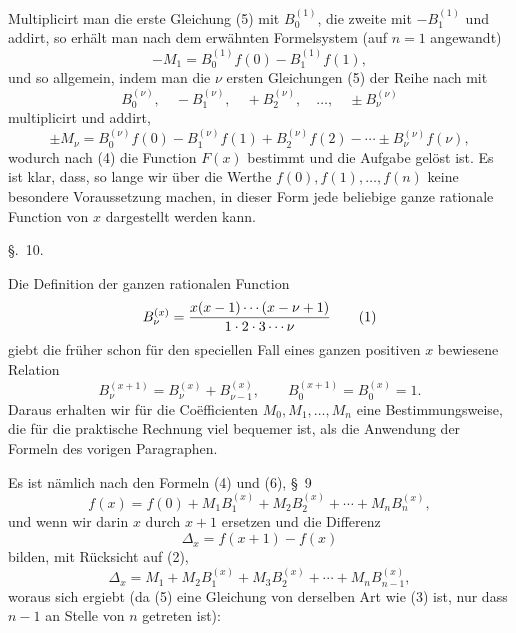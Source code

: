 
Multiplicirt man die erste Gleichung (5) mit $B_0^{(1)}$, die zweite mit $-B_1^{(1)}$ und addirt, so erhält man nach dem erwähnten Formelsystem (auf $n=1$ angewandt)
\[
 -M_1=B_0^{(1)}f(0)-B_1^{(1)}f(1),
\]
und so allgemein, indem man die $\nu$ ersten Gleichungen (5) der Reihe nach mit
\[
 B_0^{(\nu)},\quad -B_1^{(\nu)},\quad +B_2^{(\nu)},\quad \ldots,\quad \pm B_\nu^{(\nu)}
\]
multiplicirt und addirt,
\begin{equation}
 \pm M_\nu=B_0^{(\nu)}f(0)-B_1^{(\nu)}f(1)+B_2^{(\nu)}f(2)-\cdots\pm B_\nu^{(\nu)}f(\nu),
\tag{7}
\end{equation}
wodurch nach (4) die Function $F(x)$ bestimmt und die Aufgabe gelöst ist. Es ist klar, dass, so lange wir über die Werthe $f(0),f(1),\ldots,f(n)$ keine besondere Voraussetzung machen, in dieser Form jede beliebige ganze rationale Function von $x$ dargestellt werden kann.

\begin{center}
{\large \S.\ 10.}

\vspace{0.5em}
{\large{}}
\end{center}

Die Definition der ganzen rationalen Function
\begin{equation}
 B_\nu^{(x)}={x(x-1)\cdots(x-\nu+1)\over 1\cdot2\cdot3\cdots\nu}
\tag{1}
\end{equation}
giebt die früher schon für den speciellen Fall eines ganzen positiven $x$ bewiesene Relation
\begin{equation}
 B_\nu^{(x+1)}=B_\nu^{(x)}+B_{\nu-1}^{(x)},\qquad B_0^{(x+1)}=B_0^{(x)}=1.
\tag{2}
\end{equation}
Daraus erhalten wir für die Coëfficienten $M_0,M_1,\ldots,M_n$ eine Bestimmungsweise, die für die praktische Rechnung viel bequemer ist, als die Anwendung der Formeln des vorigen Paragraphen.

Es ist nämlich nach den Formeln (4) und (6), \S~9
\begin{equation}
 f(x)=f(0)+M_1B_1^{(x)}+M_2B_2^{(x)}+\cdots+M_nB_n^{(x)},
\tag{3}
\end{equation}
und wenn wir darin $x$ durch $x+1$ ersetzen und die Differenz
\begin{equation}
 \Delta_x=f(x+1)-f(x)
\tag{4}
\end{equation}
bilden, mit Rücksicht auf (2),
\begin{equation}
 \Delta_x=M_1+M_2B_1^{(x)}+M_3B_2^{(x)}+\cdots+M_nB_{n-1}^{(x)},
\tag{5}
\end{equation}
woraus sich ergiebt (da (5) eine Gleichung von derselben Art wie (3) ist, nur dass $n-1$ an Stelle von $n$ getreten ist):
